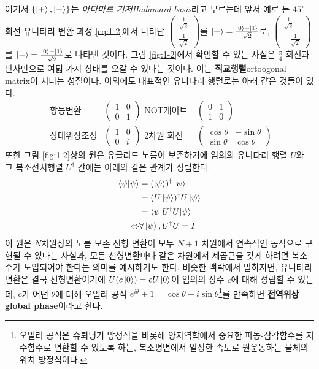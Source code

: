 \documentclass[a4paper,chapter,atbegshi]{oblivoir}
\begin{document}
여기서 $\{\ket+,\ket-\}$는 \emph{아다마르 기저\tiny Hadamard basis}라고 부르는데
앞서 예로 든 $45^{\circ}$ 회전 유니타리 변환 과정 \ref{eq:1-2}에서 나타난
$\begin{pmatrix}\frac{1}{\sqrt2}\\\frac{1}{\sqrt2}\end{pmatrix}$를 
$\ket+ = \frac{\ket0+\ket1}{\sqrt2}$로, $\begin{pmatrix}\frac{1}{\sqrt2}\\
-\frac{1}{\sqrt2}\end{pmatrix}$를 $\ket-=\frac{\ket0-\ket1}{\sqrt2}$로
나타낸 것이다. 그림 \ref{fig:1-2}에서 확인할 수 있는 사실은 $\frac{\pi}{4}$
회전과 반사만으로 여덟 가지 상태를 오갈 수 있다는 것이다. 이는
\textbf{직교행렬}{\tiny ortoogonal matrix}이 지니는 성질이다. 
이외에도 대표적인 유니타리 행렬로는 아래 같은 것들이 있다.
\[\begin{matrix}
  \textrm{ 항등변환 }&\begin{pmatrix}1 & 0 \\ 0 & 1\end{pmatrix} 
  \textrm{ NOT게이트 }&\begin{pmatrix}0 & 1 \\ 1 & 0\end{pmatrix} \\
  \textrm{ 상대위상조정}&\begin{pmatrix}1&0\\0&i\end{pmatrix}
  \textrm{ 2차원 회전 }&\begin{pmatrix}\cos\theta & -\sin\theta\\
  \sin\theta &\cos\theta\end{pmatrix}
  \end{matrix}\]
또한 그림 \ref{fig:1-2}상의 원은 유클리드 노름이 보존하기에
임의의 유니타리 행렬 $U$와 그 복소전치행렬 $U^{\dagger}$ 간에는 아래와
같은 관계가 성립한다.
\begin{align*}
  \braket{\psi|\psi} &= (\ket{\psi})^{\dagger}\ket{\psi} \\
              &= (U\ket{\psi})^{\dagger}U\ket{\psi}\\
              &=\braket{\psi|U^{\dagger}U|\psi} \\
  \Leftrightarrow&\forall\ket{\psi},U^{\dagger}U= I
\end{align*}
이 원은 $N$차원상의 노름 보존 선형 변환이 모두 $N+1$ 차원에서 연속적인
동작으로 구현될 수 있다는 사실과, 모든 선형변환마다 같은 차원에서
제곱근을 갖게 하려면 복소수가 도입되어야 한다는 의미를 예시하기도 한다. 
비슷한 맥락에서 말하자면,
유니타리 변환은 결국 선형변환이기에 $U(c\ket0)=cU\ket0$이 임의의 상수 $c$에 
대해 성립할 수 있는데, $c$가 어떤 $\theta$에 대해 오일러 공식 
$e^{i\theta}+1=\cos\theta+i\sin\theta$\footnote{오일러 공식은 슈뢰딩거
방정식을 비롯해 양자역학에서 중요한 파동-삼각함수를 지수함수로 변환할 수 있도록
하는, 복소평면에서 일정한 속도로 원운동하는 물체의 위치 방정식이다.}를 만족하면 \textbf{전역위상\tiny global phase}이라고 한다. 
\end{document}
